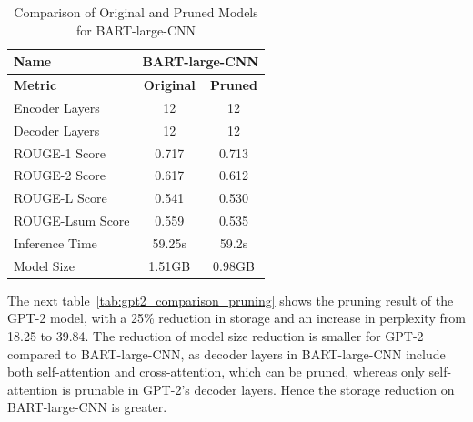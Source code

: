 \documentclass{article}
\begin{document}
    \begin{table}[h!]
        \centering
        \begin{tabular}{lcc}
            \toprule
            \textbf{Name}         & \multicolumn{2}{c}{\textbf{BART-large-CNN}} \\ \midrule
            \textbf{Metric}       & \textbf{Original} & \textbf{Pruned} \\ \midrule
            Encoder Layers        & 12                     & 12                     \\
            Decoder Layers        & 12                     & 12                     \\
            ROUGE-1 Score         & 0.717                  & 0.713                  \\
            ROUGE-2 Score         & 0.617                  & 0.612                  \\
            ROUGE-L Score         & 0.541                  & 0.530                  \\
            ROUGE-Lsum Score      & 0.559                  & 0.535                  \\
            Inference Time        & 59.25s                 & 59.2s                  \\
            Model Size            & 1.51GB                 & 0.98GB                 \\ \bottomrule
        \end{tabular}
        \caption{Comparison of Original and Pruned Models for BART-large-CNN}
        \label{tab:BART_comparison_pruning}
    \end{table}

    \hspace*{1em} The next table~\ref{tab:gpt2_comparison_pruning} shows the pruning result of the GPT-2 model, with a 25\% reduction in storage and an increase in perplexity from 18.25 to 39.84. The reduction of model size reduction is smaller for GPT-2 compared to BART-large-CNN, as decoder layers in BART-large-CNN include both self-attention and cross-attention, which can be pruned, whereas only self-attention is prunable in GPT-2's decoder layers. Hence the storage reduction on BART-large-CNN is greater.
\end{document}

